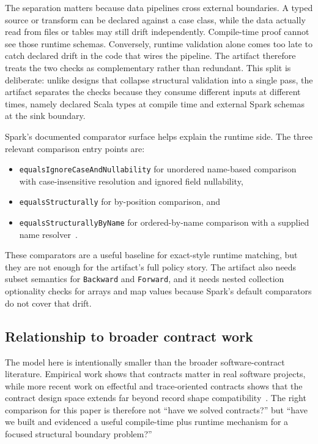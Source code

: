 The separation matters because data pipelines cross external boundaries. A typed source or transform can be declared against a case class, while the data actually read from files or tables may still drift independently. Compile-time proof cannot see those runtime schemas. Conversely, runtime validation alone comes too late to catch declared drift in the code that wires the pipeline. The artifact therefore treats the two checks as complementary rather than redundant. This split is deliberate: unlike designs that collapse structural validation into a single pass, the artifact separates the checks because they consume different inputs at different times, namely declared Scala types at compile time and external Spark schemas at the sink boundary.

Spark's documented comparator surface helps explain the runtime side. The three relevant comparison entry points are:

\begin{itemize}[leftmargin=1.5em]
  \item \texttt{equalsIgnoreCaseAndNullability} for unordered name-based comparison with case-insensitive resolution and ignored field nullability,
  \item \texttt{equalsStructurally} for by-position comparison, and
  \item \texttt{equalsStructurallyByName} for ordered-by-name comparison with a supplied name resolver~\cite{spark_datatype}.
\end{itemize}

These comparators are a useful baseline for exact-style runtime matching, but they are not enough for the artifact's full policy story. The artifact also needs subset semantics for \texttt{Backward} and \texttt{Forward}, and it needs nested collection optionality checks for arrays and map values because Spark's default comparators do not cover that drift.\carriermoved

\subsection{Relationship to broader contract work}

The model here is intentionally smaller than the broader software-contract literature. Empirical work shows that contracts matter in real software projects, while more recent work on effectful and trace-oriented contracts shows that the contract design space extends far beyond record shape compatibility~\cite{contracts_in_practice,effectful_software_contracts,trace_contracts}. The right comparison for this paper is therefore not ``have we solved contracts?'' but ``have we built and evidenced a useful compile-time plus runtime mechanism for a focused structural boundary problem?''
